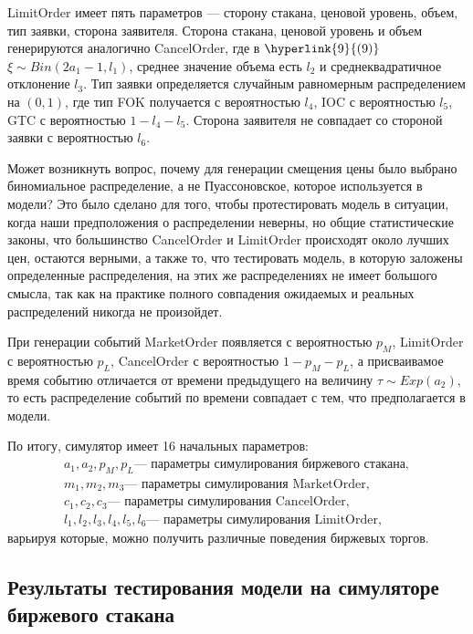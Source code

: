 \documentclass[12pt, a4paper]{article}
\begin{document}
LimitOrder имеет пять параметров --- сторону стакана, ценовой уровень, объем, тип заявки, сторона заявителя. Сторона стакана, ценовой уровень и объем генерируются аналогично CancelOrder, где в $\hyperlink{9}{(9)}$ $\xi \sim Bin(2a_1 - 1, l_1)$, среднее значение объема есть $l_2$ и среднеквадратичное отклонение $l_3$. Тип заявки определяется случайным равномерным распределением на $(0, 1)$, где тип FOK получается с вероятностью $l_4$, IOC с вероятностью $l_5$, GTC с вероятностью $1 - l_4 - l_5$. Сторона заявителя не совпадает со стороной заявки с вероятностью $l_6$.

Может возникнуть вопрос, почему для генерации смещения цены было выбрано биномиальное распределение, а не Пуассоновское, которое используется в модели? Это было сделано для того, чтобы протестировать модель в ситуации, когда наши предположения о распределении неверны, но общие статистические законы, что большинство CancelOrder и LimitOrder происходят около лучших цен, остаются верными, а также то, что тестировать модель, в которую заложены определенные распределения, на этих же распределениях не имеет большого смысла, так как на практике полного совпадения ожидаемых и реальных распределений никогда не произойдет.

При генерации событий MarketOrder появляется с вероятностью $p_M$, LimitOrder с вероятностью $p_L$, CancelOrder с вероятностью $1 - p_M - p_L$, а присваивамое время событию отличается от времени предыдущего на величину $\tau \sim Exp(a_2)$, то есть распределение событий по времени совпадает с тем, что предполагается в модели.

По итогу, симулятор имеет 16 начальных параметров: 
\[
\begin{array}{c}
a_1, a_2, p_M, p_L \text{--- параметры симулирования биржевого стакана}, \\
m_1, m_2, m_3 \text{--- параметры симулирования MarketOrder}, \\
c_1, c_2, c_3 \text{--- параметры симулирования CancelOrder}, \\
l_1, l_2, l_3, l_4, l_5, l_6 \text{--- параметры симулирования LimitOrder},
\end{array}
\]
варьируя которые, можно получить различные поведения биржевых торгов.

\subsection{Результаты тестирования модели на симуляторе биржевого стакана}
\end{document}
